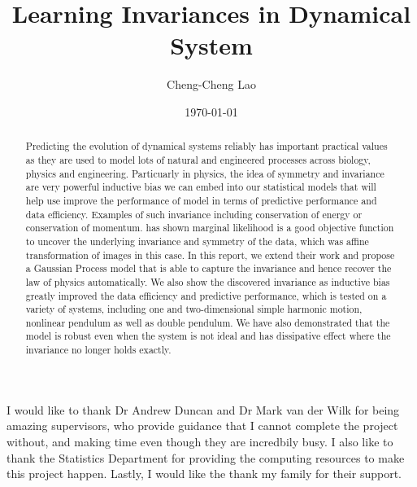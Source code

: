 \documentclass{statsmsc}
\title{Learning Invariances in Dynamical System}
\author{Cheng-Cheng Lao}
\date{\today}
\begin{document}
\maketitle


\declarationdate{\today}
\declaration 


\begin{abstract}
Predicting the evolution of dynamical systems reliably has important practical values as they are used to model lots of natural and engineered processes across biology, physics and engineering.
Particuarly in physics, the idea of symmetry and invariance are very powerful inductive bias we can embed into our statistical models that will help use improve the performance of model in terms of predictive performance and data efficiency.
Examples of such invariance including conservation of energy or conservation of momentum.
\cite{Mark2017} has shown marginal likelihood is a good objective function to uncover the underlying invariance and symmetry of the data, which was affine transformation of images in this case. 
In this report, we extend their work and propose a Gaussian Process model that is able to capture the invariance and hence recover the law of physics automatically.
We also show the discovered invariance as inductive bias greatly improved the data efficiency and predictive performance, which is tested on a variety of systems, including one and two-dimensional simple harmonic motion, nonlinear pendulum as well as double pendulum.
We have also demonstrated that the model is robust even when the system is not ideal and has dissipative effect where the invariance no longer holds exactly. 
\end{abstract}

\begin{acknowledgements}
I would like to thank Dr Andrew Duncan and Dr Mark van der Wilk for being amazing supervisors, who provide guidance that I cannot complete the project without, and making time even though they are incredbily busy. 
I also like to thank the Statistics Department for providing the computing resources to make this project happen.
Lastly, I would like the thank my family for their support.

\end{acknowledgements}


\mainmatter
\tableofcontents
\end{document}
